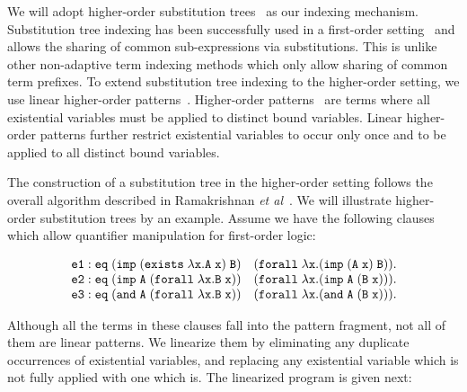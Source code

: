 \documentclass{llncs}
\newcommand{\andLF}{\tt{and}\;}
\newcommand{\impLF}{\tt{imp}\;}
\newcommand{\forallLF}{\tt{forall}\;}
\newcommand{\existsLF}{\tt{exists}\;}
\newcommand{\eqLF}{\tt{eq}\;}
\newcommand{\eqilLF}{\tt{e1}}
\newcommand{\eqirLF}{\tt{e2}}
\newcommand{\eqalLF}{\tt{e3}}
\begin{document}
We will adopt higher-order substitution
trees~\cite{Pientka:ICLP03,Pientka03phd} as our indexing mechanism.
Substitution tree indexing has been successfully used in a first-order
setting~\cite{Graf+Book95} and allows the sharing of common
sub-expressions via substitutions. This is unlike other non-adaptive
term indexing methods which only allow sharing of common term
prefixes. To extend substitution tree indexing to the higher-order
setting, we use linear higher-order
patterns~\cite{PientkaPfenning:CADE03}. Higher-order
patterns~\cite{Miller91iclp} are terms where all existential variables
must be applied to distinct bound variables. Linear higher-order
patterns further restrict existential variables to occur only once
and to be applied to all distinct bound variables.

The construction of a
substitution tree in the higher-order setting follows the overall
algorithm described in Ramakrishnan {\em et
al}~\cite{Ramakrishnan01:indexing}. We will illustrate higher-order
substitution trees by an example. Assume we have the following clauses
which allow quantifier manipulation for first-order logic:
\begin{small}
\[
\begin{array}{l}
\eqilLF: \eqLF (\impLF (\existsLF \lambda x. A\; x)\; B)\quad (\forallLF \lambda x. (\impLF (A\; x)\; B)).\\
\eqirLF: \eqLF (\impLF A\; (\forallLF \lambda x. B\;x)) \quad (\forallLF \lambda x. (\impLF A \; (B\; x))).\\
\eqalLF: \eqLF (\andLF A \; (\forallLF \lambda x. B\; x)) \quad (\forallLF \lambda x. (\andLF A \; (B\;x))).\\
\end{array}
\]
\end{small}

Although all the terms in these clauses fall
into the pattern fragment, not all of them are linear patterns.
We linearize them by eliminating any duplicate
occurrences of existential variables, and replacing any existential
variable which is not fully applied with one which is. The linearized
program  is given next:
\end{document}
